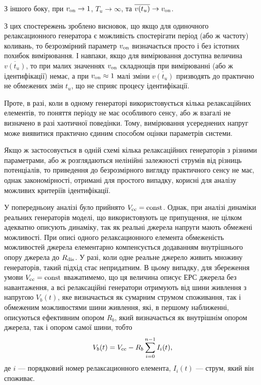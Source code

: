 З іншого боку, при
$ v _\mathrm{on} \to 1 $,
$ T_u \to \infty $,
та
$ \overline{v(t_u)} \to v_\mathrm{on}$.

З цих спостережень зроблено висновок, що якщо для одиночного
релаксационного генератора є можливість спостерігати період
(або ж частоту) коливань, то безрозмірний параметр
$ v _\mathrm{on} $ визначається просто і без істотних похибок
вимірювання. І навпаки, якщо для вимірювання доступна величина
$ \overline{v (t_u)} $, то при малих значеннях
$ v _\mathrm{on} $ складнощів при вимірюванні (або ж ідентифікації) немає,
а при
$ v _\mathrm{on} \approx 1 $ малі зміни
$ \overline{v (t_u)} $ призводять до практично не обмежених змін
$ t_u $, що не сприяє процесу ідентифікації.

Проте, в разі, коли в одному генераторі використовується
кілька релаксаційних елементів, то поняття періоду не має
особливого сенсу, або ж взагалі не визначено в разі хаотичної
поведінки. Тому, вимірювання усереднених напруг може виявитися
практично єдиним способом оцінки параметрів системи.


Якщо ж застосовується в одній схемі кілька релаксаційних
генераторів з різними параметрами, або ж розглядаються
нелінійні залежності струмів від різниць потенціалів, то
приведення до безрозмірного вигляду практичного сенсу не має,
однак закономірності, отримані для простого випадку, корисні
для аналізу можливих критеріїв ідентифікації.


У попередньоиу аналізі було прийнято
$ V _\mathrm{cc} = \mathrm{const} $. Однак, при аналізі динаміки реальних
генераторів моделі, що використовують це припущення, не цілком
адекватно описують динаміку, так як реальні джерела напруги
мають обмежені можливості. При описі одного релаксационного
елемента обмеженість можливостей джерела елементарно
компенсується додаванням внутрішнього опору джерела до
$ R _\mathrm{dis} $. У разі, коли одне реальне джерело живить множину
генераторів, такий підхід стає непридатним. В цьому випадку,
для збереження умови
$ V _\mathrm{cc} = \mathrm{const} $ вважатимемо, що ця величина описує ЕРС джерела
без навантаження, а всі релаксаційні генератори отримують від
шини живлення з напругою
$ V_b (t) $, яке визначається як сумарним струмом споживання,
так і обмеженим можливостями шини живлення, які, в першому
наближенні, описуються ефективним опором
$ R_b $, який визначається як внутрішнім опором джерела, так і
опором самої шини, тобто
%
\begin{equation}
  V_b(t) = V_\mathrm{cc} - R_b \sum\limits_{i=0}^{n-1} I_i(t),
  \label{atu:eq:V_b_relax}
\end{equation}
%
де $i$ ---
порядковий номер релаксационного елемента,
$ I_i (t) $ --- струм, який він споживає.


